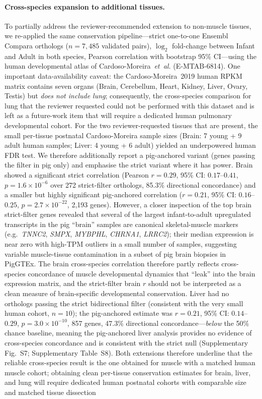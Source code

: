 \documentclass[10pt,a4paper]{article}
\begin{document}
\paragraph{Cross-species expansion to additional tissues.} To partially address the reviewer-recommended extension to non-muscle tissues, we re-applied the same conservation pipeline---strict one-to-one Ensembl Compara orthologs ($n = 7{,}485$ validated pairs), $\log_2$ fold-change between Infant and Adult in both species, Pearson correlation with bootstrap 95\% CI---using the human developmental atlas of Cardoso-Moreira~\textit{et~al.}\cite{cardoso-moreira_gene_2019} (E-MTAB-6814). One important data-availability caveat: the Cardoso-Moreira~2019 human RPKM matrix contains seven organs (Brain, Cerebellum, Heart, Kidney, Liver, Ovary, Testis) but \emph{does not include lung}; consequently, the cross-species comparison for lung that the reviewer requested could not be performed with this dataset and is left as a future-work item that will require a dedicated human pulmonary developmental cohort. For the two reviewer-requested tissues that are present, the small per-tissue postnatal Cardoso-Moreira sample sizes (Brain: 7 young + 9 adult human samples; Liver: 4 young + 6 adult) yielded an underpowered human FDR test. We therefore additionally report a pig-anchored variant (genes passing the filter in pig only) and emphasise the strict variant where it has power. Brain showed a significant strict correlation (Pearson $r = 0.29$, 95\% CI: $0.17$--$0.41$, $p = 1.6 \times 10^{-6}$ over 272 strict-filter orthologs, 85.3\% directional concordance) and a smaller but highly significant pig-anchored correlation ($r = 0.21$, 95\% CI: $0.16$--$0.25$, $p = 2.7 \times 10^{-22}$, 2{,}193 genes). However, a closer inspection of the top brain strict-filter genes revealed that several of the largest infant-to-adult upregulated transcripts in the pig ``brain'' samples are canonical skeletal-muscle markers (e.g.\ \textit{TNNC2}, \textit{SMPX}, \textit{MYBPHL}, \textit{CHRNA1}, \textit{LRRC2}); their median expression is near zero with high-TPM outliers in a small number of samples, suggesting variable muscle-tissue contamination in a subset of pig brain biopsies in PigGTEx. The brain cross-species correlation therefore partly reflects cross-species concordance of muscle developmental dynamics that ``leak'' into the brain expression matrix, and the strict-filter brain $r$ should not be interpreted as a clean measure of brain-specific developmental conservation. Liver had no orthologs passing the strict bidirectional filter (consistent with the very small human cohort, $n = 10$); the pig-anchored estimate was $r = 0.21$, 95\% CI: $0.14$--$0.29$, $p = 3.0 \times 10^{-10}$, 857 genes, 47.3\% directional concordance---\emph{below} the 50\% chance baseline, meaning the pig-anchored liver analysis provides no evidence of cross-species concordance and is consistent with the strict null (Supplementary Fig.~S7; Supplementary Table~S8). Both extensions therefore underline that the reliable cross-species result is the one obtained for muscle with a matched human muscle cohort; obtaining clean per-tissue conservation estimates for brain, liver, and lung will require dedicated human postnatal cohorts with comparable size and matched tissue dissection 
\end{document}
